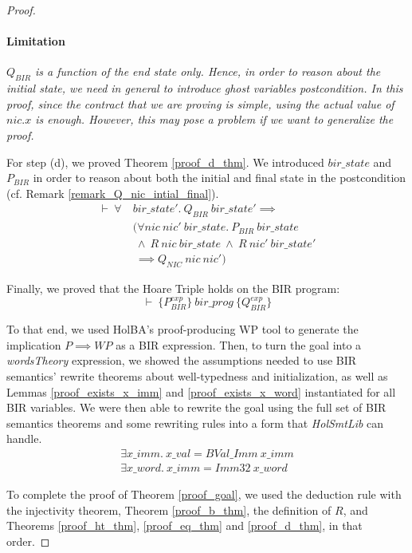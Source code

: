 \documentclass[10pt,a4paper]{article}
\newcommand{\htriple}[3]{\ensuremath{\{#1\}~#2~\{#3\}}}
\begin{document}
\begin{multicols}{2}
\begin{proof}
\paragraph{Limitation} \textit{$Q_{BIR}$ is a function of the end state only. Hence, in order to reason about the initial state, we need in general to introduce ghost variables postcondition. In this proof, since the contract that we are proving is simple, using the actual value of $nic.x$ is enough. However, this may pose a problem if we want to generalize the proof.}
\medskip

For step (d), we proved Theorem \ref{proof_d_thm}. We introduced $bir\_state$ and $P_{BIR}$ in order to reason about both the initial and final state in the postcondition (cf. Remark \ref{remark_Q_nic_intial_final}).
%
\begin{equation} \label{proof_d_thm}
\begin{split}
\vdash~\forall~&bir\_state'.~Q_{BIR}~bir\_state' \implies\\
	&(\forall nic~nic'~bir\_state.~P_{BIR}~bir\_state\\
	&~\land~R~nic~bir\_state~\land~R~nic'~bir\_state'\\
	&~\implies Q_{NIC}~nic~nic')
\end{split}
\end{equation}

Finally, we proved that the Hoare Triple holds on the BIR program:
%
\begin{equation} \label{proof_ht_thm}
\vdash~\htriple{P^{exp}_{BIR}}{bir\_prog}{Q^{exp}_{BIR}}
\end{equation}

To that end, we used HolBA's proof-producing WP tool to generate the implication $P \implies WP$ as a BIR expression. Then, to turn the goal into a \textit{wordsTheory} expression, we showed the assumptions needed to use BIR semantics' rewrite theorems about well-typedness and initialization, as well as Lemmas \ref{proof_exists_x_imm} and \ref{proof_exists_x_word} instantiated for all BIR variables. We were then able to rewrite the goal using the full set of BIR semantics theorems and some rewriting rules into a form that \textit{HolSmtLib} can handle.
%
\begin{align}
  \label{proof_exists_x_imm}
  \exists x\_imm.~x\_val = BVal\_Imm~x\_imm\\
  \label{proof_exists_x_word}
  \exists x\_word.~x\_imm = Imm32~x\_word
\end{align}

To complete the proof of Theorem \ref{proof_goal}, we used the deduction rule with the injectivity theorem, Theorem \ref{proof_b_thm}, the definition of $R$, and Theorems \ref{proof_ht_thm}, \ref{proof_eq_thm} and \ref{proof_d_thm}, in that order.
\end{proof}


\end{multicols}
\end{document}
